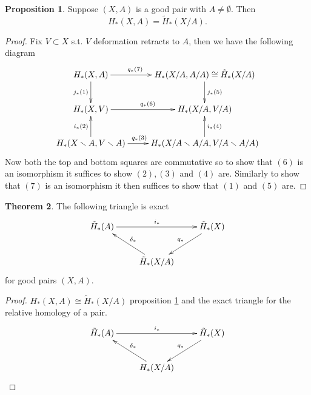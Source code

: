 \documentclass[12pt]{article}
\theoremstyle{definition}
\newtheorem{thm}{Theorem}[subsection]
\newtheorem{prop}[thm]{Proposition}
\theoremstyle{definition}
\renewcommand{\H}{H_*}
\begin{document}
\begin{prop}\label{pairiso}%
Suppose $(X,A)$ is a good pair with $A \ne \emptyset$.
Then 
\[
\H(X,A) = \tilde\H(X/A).
\]
\end{prop}
\begin{proof}
Fix $V \subset X$ s.t. $V$ deformation retracts to $A$, then we have the following diagram
\[
\xymatrix
{
\H(X,A)\ar[d]_{j_* (1)} \ar[r]^{q_* (7) \quad\qquad} & \H(X/A,A/A) \cong \tilde\H(X/A)\ar[d]^{j_* (5)}\\
\H(X,V) \ar[r]^{q_* (6)}  & \H(X/A,V/A)\\
\H(X\smallsetminus A,V\smallsetminus A)\ar[u]^{i_* (2)} \ar[r]^{q_* (3)\qquad}& \H(X/A\smallsetminus A/A,V/A\smallsetminus A/A)\ar[u]_{i_* (4)}
}
\]
Now both the top and bottom squares are commutative so to show that $(6)$ is an isomorphism it suffices to show $(2),(3)$ and $(4)$ are.
Similarly to show that $(7)$ is an isomorphism it then suffices to show that $(1)$ and $(5)$ are.
\end{proof}

\begin{thm}
The following triangle is exact
\[
\xymatrix
{
 \tilde\H(A) \ar[rr]^{i_*}& &\tilde\H(X)\ar[dl]_{q_*} \\
 &\tilde\H(X/A) \ar[ul]_{\delta_*}&
}
\]
for good pairs $(X,A)$.
\end{thm}
\begin{proof}
$\H(X,A) \cong \tilde\H(X/A)$ proposition \ref{pairiso} and the exact triangle for the relative homology of a pair.
\[
\xymatrix
{
 \tilde\H(A) \ar[rr]^{i_*}& &\tilde\H(X)\ar[dl]_{q_*} \\
 &\H(X/A) \ar[ul]_{\delta_*}&
}
\]
\end{proof}
\end{document}
